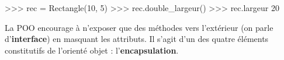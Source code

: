 \documentclass[
  french,
  letterpaper,
  DIV=11,
  numbers=noendperiod]{scrartcl}
\newenvironment{Shaded}{\begin{snugshade}}{\end{snugshade}}
\newcommand{\DecValTok}[1]{\textcolor[rgb]{0.68,0.00,0.00}{#1}}
\newcommand{\NormalTok}[1]{\textcolor[rgb]{0.00,0.23,0.31}{#1}}
\newcommand{\OperatorTok}[1]{\textcolor[rgb]{0.37,0.37,0.37}{#1}}
\begin{document}
\begin{Shaded}
\begin{Highlighting}[]
\OperatorTok{\textgreater{}\textgreater{}\textgreater{}}\NormalTok{ rec }\OperatorTok{=}\NormalTok{ Rectangle(}\DecValTok{10}\NormalTok{, }\DecValTok{5}\NormalTok{)}
\OperatorTok{\textgreater{}\textgreater{}\textgreater{}}\NormalTok{ rec.double\_largeur()}
\OperatorTok{\textgreater{}\textgreater{}\textgreater{}}\NormalTok{ rec.largeur}
\DecValTok{20}
\end{Highlighting}
\end{Shaded}

La POO encourage à n'exposer que des méthodes vers l'extérieur (on parle
d'\textbf{interface}) en masquant les attributs. Il s'agit d'un des
quatre éléments constitutifs de l'orienté objet :
l'\textbf{encapsulation}.
\end{document}
